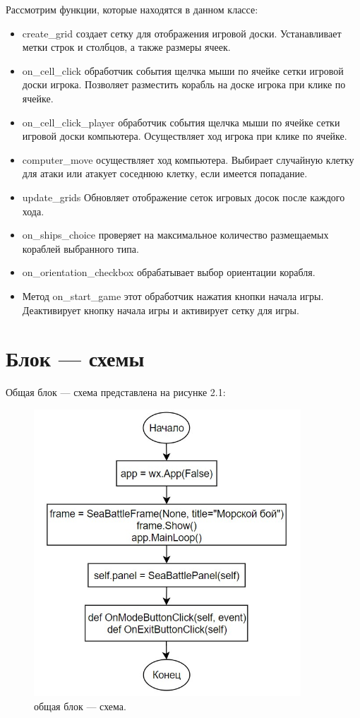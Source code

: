 Рассмотрим функции, которые находятся в данном классе:
\begin{itemize}
    \item create\_grid создает сетку для отображения игровой доски. Устанавливает метки строк и столбцов, а также размеры ячеек.
    \item on\_cell\_click обработчик события щелчка мыши по ячейке сетки игровой доски игрока. Позволяет разместить корабль на доске игрока при клике по ячейке.
    \item on\_cell\_click\_player обработчик события щелчка мыши по ячейке сетки игровой доски компьютера. Осуществляет ход игрока при клике по ячейке.
    \item computer\_move осуществляет ход компьютера. Выбирает случайную клетку для атаки или атакует соседнюю клетку, если имеется попадание.
    \item update\_grids Обновляет отображение сеток игровых досок после каждого хода.
    \item on\_ships\_choice проверяет на максимальное количество размещаемых кораблей выбранного типа.
    \item on\_orientation\_checkbox обрабатывает выбор ориентации корабля.
    \item Метод on\_start\_game этот обработчик нажатия кнопки начала игры. Деактивирует кнопку начала игры и активирует сетку для игры.
\end{itemize}
\section{\label{sec:ch02/sec06}Блок --- схемы}
Общая блок --- схема представлена на рисунке 2.1:
\begin{figure}[H]
\graphicspath{ {img/} }
\centering
\includegraphics[width = 10cm]{общая.jpg}
\caption{общая блок --- схема.}
\end{figure}

